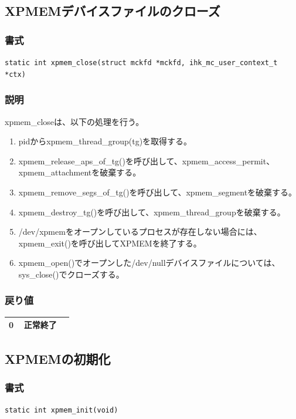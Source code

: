 \documentclass[twoside,11pt,fleqn]{book}
\begin{document}
\subsection{XPMEMデバイスファイルのクローズ}
\subsubsection*{書式}{\quad}
\texttt{static int xpmem\_close(struct mckfd *mckfd, ihk\_mc\_user\_context\_t *ctx)
}

\subsubsection*{説明}{\quad}
xpmem\_closeは、以下の処理を行う。
\begin{enumerate}
  \item pidからxpmem\_thread\_group(tg)を取得する。
  \item xpmem\_release\_aps\_of\_tg()を呼び出して、xpmem\_access\_permit、xpmem\_attachmentを破棄する。
  \item xpmem\_remove\_segs\_of\_tg()を呼び出して、xpmem\_segmentを破棄する。
  \item xpmem\_destroy\_tg()を呼び出して、xpmem\_thread\_groupを破棄する。
  \item /dev/xpmemをオープンしているプロセスが存在しない場合には、xpmem\_exit()を呼び出してXPMEMを終了する。
  \item xpmem\_open()でオープンした/dev/nullデバイスファイルについては、sys\_close()でクローズする。
\end{enumerate}

\subsubsection*{戻り値}{\quad}
\begin{table}[!h]
\footnotesize
\begin{tabular}{|p{0.20\linewidth}|p{0.66\linewidth}|} \hline
0&正常終了\\ \hline
\end{tabular}
\vspace{-0em}
\end{table}
\FloatBarrier

\subsection{XPMEMの初期化}
\subsubsection*{書式}{\quad}
\texttt{static int xpmem\_init(void)}
\end{document}
